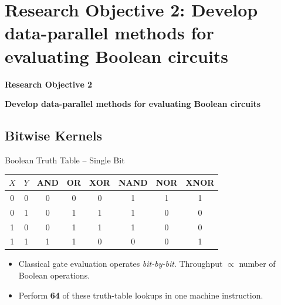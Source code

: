 \section{Research Objective 2: Develop data-parallel methods for evaluating Boolean circuits}
\begin{frame}
    \Large{\centerline{\textbf{Research Objective 2}}}
    \vspace{6pt}
    \large{\centerline{\textbf{Develop data-parallel methods for evaluating Boolean circuits}}}
\end{frame}

\subsection{Bitwise Kernels}
\begin{frame}{Boolean Truth Table – Single Bit}
\centering
\begin{tabular}{c|c|c|c|c|c|c|c}
$X$ & $Y$ & AND & OR & XOR & NAND & NOR & XNOR \\ \hline
0 & 0 & 0 & 0 & 0 & 1 & 1 & 1 \\
0 & 1 & 0 & 1 & 1 & 1 & 0 & 0 \\
1 & 0 & 0 & 1 & 1 & 1 & 0 & 0 \\
1 & 1 & 1 & 1 & 0 & 0 & 0 & 1 \\
\end{tabular}
\vspace{8pt}
\begin{itemize}
  \item Classical gate evaluation operates \emph{bit-by-bit}.  Throughput $\propto$ number of Boolean operations.
  \item Perform \textbf{64} of these truth-table lookups in one machine instruction.
\end{itemize}
\end{frame}

